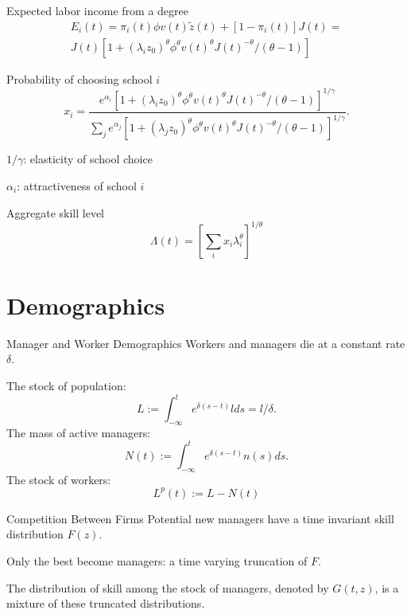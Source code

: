 \documentclass[
  ignorenonframetext,
  aspectratio=1610,
]{beamer}
\begin{document}
\begin{frame}{Expected labor income from a degree}
\protect\hypertarget{expected-labor-income-from-a-degree}{}
\begin{multline*}
E_i(t) = 
\pi_i(t)\phi v(t) \tilde z(t) + [1-\pi_i(t)] J(t) = \\
J(t) \left[
1 + (\lambda_i z_0)^\theta \phi^{\theta} v(t)^\theta J(t)^{-\theta}/(\theta-1)
\right]
\end{multline*}
\end{frame}

\begin{frame}{Probability of choosing school \(i\)}
\protect\hypertarget{probability-of-choosing-school-i}{}
\[
x_i = \frac {e^{\alpha_i} \left[
1 + (\lambda_i z_0)^\theta \phi^{\theta} v(t)^\theta J(t)^{-\theta}/(\theta-1)
\right]^{1/\gamma}   } 
{\sum_j e^{\alpha_j}\left[
1 + (\lambda_j z_0)^\theta \phi^{\theta} v(t)^\theta J(t)^{-\theta}/(\theta-1)
\right]^{1/\gamma}   }.
\]

\(1/\gamma\): elasticity of school choice

\(\alpha_i\): attractiveness of school \(i\)
\end{frame}

\begin{frame}{Aggregate skill level}
\protect\hypertarget{aggregate-skill-level}{}
\[
\Lambda(t) = \left[\sum_i x_i \lambda_i^\theta \right]^{1/\theta}
\]
\end{frame}

\section{Demographics}\label{demographics}

\begin{frame}{Manager and Worker Demographics}
\protect\hypertarget{manager-and-worker-demographics}{}
Workers and managers die at a constant rate \(\delta\).

The stock of population: \[
L := \int_{-\infty}^t e^{\delta{(s-t)}}l ds = l/\delta.
\] The mass of active managers: \[
N(t) := \int_{-\infty}^t e^{\delta{(s-t)}}n(s) ds.
\] The stock of workers: \[L^{p} (t) := L-N(t)\]
\end{frame}

\begin{frame}{Competition Between Firms}
\protect\hypertarget{competition-between-firms}{}
Potential new managers have a time invariant skill distribution
\(F(z)\).

Only the best become managers: a time varying truncation of \(F\).

The distribution of skill among the stock of managers, denoted by
\(G(t, z)\), is a mixture of these truncated distributions.
\end{frame}
\end{document}
